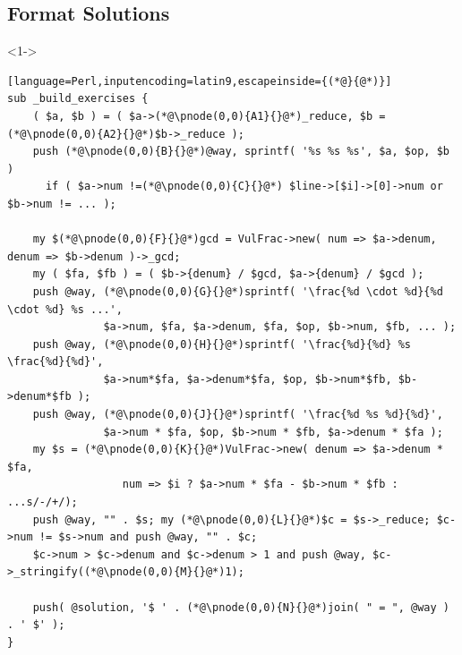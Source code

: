 \documentclass[ngerman,xcolor={table,dvipsnames},smaller,compress,hyperref={bookmarks,colorlinks}]{beamer}
\begin{document}
\subsection{Format Solutions}

\begin{frame}[t,fragile]

\begin{block}<1->{}
\scriptsize
\begin{lstlisting}[language=Perl,inputencoding=latin9,escapeinside={(*@}{@*)}]
sub _build_exercises {
    ( $a, $b ) = ( $a->(*@\pnode(0,0){A1}{}@*)_reduce, $b = (*@\pnode(0,0){A2}{}@*)$b->_reduce );
    push (*@\pnode(0,0){B}{}@*)@way, sprintf( '%s %s %s', $a, $op, $b )
      if ( $a->num !=(*@\pnode(0,0){C}{}@*) $line->[$i]->[0]->num or $b->num != ... );

    my $(*@\pnode(0,0){F}{}@*)gcd = VulFrac->new( num => $a->denum, denum => $b->denum )->_gcd;
    my ( $fa, $fb ) = ( $b->{denum} / $gcd, $a->{denum} / $gcd );
    push @way, (*@\pnode(0,0){G}{}@*)sprintf( '\frac{%d \cdot %d}{%d \cdot %d} %s ...',
               $a->num, $fa, $a->denum, $fa, $op, $b->num, $fb, ... );
    push @way, (*@\pnode(0,0){H}{}@*)sprintf( '\frac{%d}{%d} %s \frac{%d}{%d}',
               $a->num*$fa, $a->denum*$fa, $op, $b->num*$fb, $b->denum*$fb );
    push @way, (*@\pnode(0,0){J}{}@*)sprintf( '\frac{%d %s %d}{%d}',
               $a->num * $fa, $op, $b->num * $fb, $a->denum * $fa );
    my $s = (*@\pnode(0,0){K}{}@*)VulFrac->new( denum => $a->denum * $fa,
                  num => $i ? $a->num * $fa - $b->num * $fb : ...s/-/+/);
    push @way, "" . $s; my (*@\pnode(0,0){L}{}@*)$c = $s->_reduce; $c->num != $s->num and push @way, "" . $c;
    $c->num > $c->denum and $c->denum > 1 and push @way, $c->_stringify((*@\pnode(0,0){M}{}@*)1);

    push( @solution, '$ ' . (*@\pnode(0,0){N}{}@*)join( " = ", @way ) . ' $' );
}
\end{lstlisting}
\end{block}


\end{frame}
\end{document}

